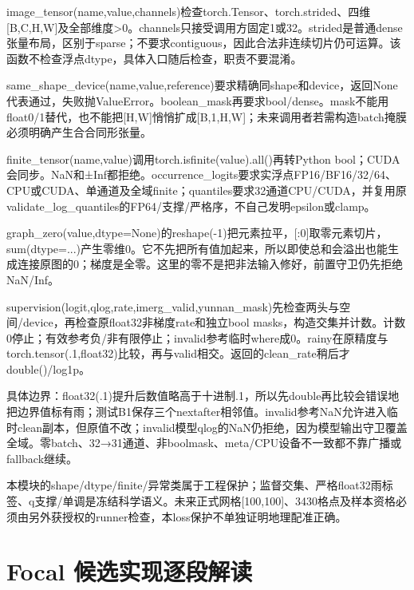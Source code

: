\documentclass[UTF8,fontset=fandol,10pt]{ctexart}
\begin{document}
image\_\allowbreak{}tensor(name,value,channels)检查torch.Tensor、torch.strided、四维[B,C,H,W]及全部维度>0。channels只接受调用方固定1或32。strided是普通dense张量布局，区别于sparse；不要求contiguous，因此合法非连续切片仍可运算。该函数不检查浮点dtype，具体入口随后检查，职责不要混淆。

same\_\allowbreak{}shape\_\allowbreak{}device(name,value,reference)要求精确同shape和device，返回None代表通过，失败抛ValueError。boolean\_\allowbreak{}mask再要求bool/\allowbreak{}dense。mask不能用float0/\allowbreak{}1替代，也不能把[H,W]悄悄扩成[B,1,H,W]；未来调用者若需构造batch掩膜必须明确产生合合同形张量。

finite\_\allowbreak{}tensor(name,value)调用torch.isfinite(value).all()再转Python bool；CUDA会同步。NaN和±Inf都拒绝。occurrence\_\allowbreak{}logits要求实浮点FP16/\allowbreak{}BF16/\allowbreak{}32/\allowbreak{}64、CPU或CUDA、单通道及全域finite；quantiles要求32通道CPU/\allowbreak{}CUDA，并复用原validate\_\allowbreak{}log\_\allowbreak{}quantiles的FP64/\allowbreak{}支撑/\allowbreak{}严格序，不自己发明epsilon或clamp。

graph\_\allowbreak{}zero(value,dtype=None)的reshape(-1)把元素拉平，[:0]取零元素切片，sum(dtype=...)产生零维0。它不先把所有值加起来，所以即使总和会溢出也能生成连接原图的0；梯度是全零。这里的零不是把非法输入修好，前置守卫仍先拒绝NaN/\allowbreak{}Inf。

supervision(logit,qlog,rate,imerg\_\allowbreak{}valid,yunnan\_\allowbreak{}mask)先检查两头与空间/\allowbreak{}device，再检查原float32非梯度rate和独立bool masks，构造交集并计数。计数0停止；有效参考负/\allowbreak{}非有限停止；invalid参考临时where成0。rainy在原精度与torch.tensor(.1,float32)比较，再与valid相交。返回的clean\_\allowbreak{}rate稍后才double()/\allowbreak{}log1p。

具体边界：float32(.1)提升后数值略高于十进制.1，所以先double再比较会错误地把边界值标有雨；测试B1保存三个nextafter相邻值。invalid参考NaN允许进入临时clean副本，但原值不改；invalid模型qlog的NaN仍拒绝，因为模型输出守卫覆盖全域。零batch、32→31通道、非boolmask、meta/\allowbreak{}CPU设备不一致都不靠广播或fallback继续。

本模块的shape/\allowbreak{}dtype/\allowbreak{}finite/\allowbreak{}异常类属于工程保护；监督交集、严格float32雨标签、q支撑/\allowbreak{}单调是冻结科学语义。未来正式网格[100,100]、3430格点及样本资格必须由另外获授权的runner检查，本loss保护不单独证明地理配准正确。
\clearpage\section{Focal 候选实现逐段解读}
\end{document}
